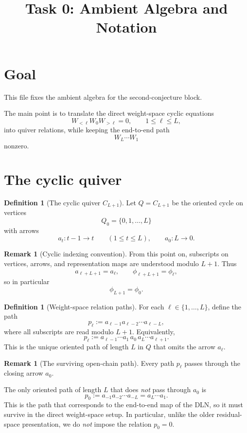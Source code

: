 \documentclass{article}
\title{Task 0: Ambient Algebra and Notation}
\date{}
\theoremstyle{definition}
\newtheorem{definition}[theorem]{Definition}
\newtheorem{remark}[theorem]{Remark}
\begin{document}
\maketitle

\section{Goal}

This file fixes the ambient algebra for the second-conjecture block.

The main point is to translate the direct weight-space cyclic equations
\[
W_{<\ell}W_0W_{>\ell}=0,
\qquad
1\le \ell\le L,
\]
into quiver relations, while keeping the end-to-end path
\[
W_L\cdots W_1
\]
nonzero.

\section{The cyclic quiver}

\begin{definition}[The cyclic quiver $C_{L+1}$]
Let $Q=C_{L+1}$ be the oriented cycle on vertices
\[
Q_0=\{0,1,\dots,L\}
\]
with arrows
\[
a_t:t-1\to t
\qquad
(1\le t\le L),
\qquad
a_0:L\to 0.
\]
\end{definition}

\begin{remark}[Cyclic indexing convention]
From this point on, subscripts on vertices, arrows, and representation maps are
understood modulo $L+1$. Thus
\[
a_{\ell+L+1}=a_\ell,
\qquad
\phi_{\ell+L+1}=\phi_\ell,
\]
so in particular
\[
\phi_{L+1}=\phi_0.
\]
\end{remark}

\begin{definition}[Weight-space relation paths]
For each $\ell\in\{1,\dots,L\}$, define the path
\[
p_\ell
:=
a_{\ell-1}a_{\ell-2}\cdots a_{\ell-L},
\]
where all subscripts are read modulo $L+1$. Equivalently,
\[
p_\ell
:=
a_{\ell-1}\cdots a_1\,a_0\,a_L\cdots a_{\ell+1}.
\]
This is the unique oriented path of length $L$ in $Q$ that omits the arrow
$a_\ell$.
\end{definition}

\begin{remark}[The surviving open-chain path]
Every path $p_\ell$ passes through the closing arrow $a_0$.

The only oriented path of length $L$ that does \emph{not} pass through $a_0$ is
\[
p_0:=a_{-1}a_{-2}\cdots a_{-L}=a_L\cdots a_1.
\]
This is the path that corresponds to the end-to-end map of the DLN, so it must
survive in the direct weight-space setup. In particular, unlike the older
residual-space presentation, we do \emph{not} impose the relation $p_0=0$.
\end{remark}
\end{document}
